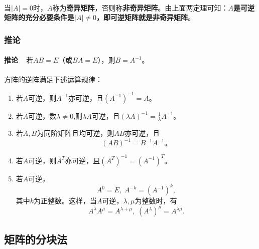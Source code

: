 \paragraph{}
当$|A|=0$时，$A$称为\textbf{奇异矩阵}，否则称\textbf{非奇异矩阵}。由上面两定理可知：\textbf{$A$是可逆矩阵的充分必要条件是$|A|\neq 0$，即可逆矩阵就是非奇异矩阵}。

\subsubsection{推论}
\paragraph{}
\textbf{推论~~}若$AB=E$（或$BA=E$），则$B=A^{-1}$。

\paragraph{}
方阵的逆阵满足下述运算规律：
\begin{enumerate}
  \item 若$A$可逆，则$A^{-1}$亦可逆，且$(A^{-1})^{-1} = A$。
  \item 若$A$可逆，数$\lambda\neq 0$,则$\lambda A$可逆，且$(\lambda A)^{-1} = \frac{1}{\lambda}A^{-1}$。
  \item 若$A,B$为同阶矩阵且均可逆，则$AB$亦可逆，且
  \begin{equation*}
    (AB)^{-1} = B^{-1}A^{-1}。
  \end{equation*}
  \item 若$A$可逆，则$A^T$亦可逆，且$(A^T)^{-1}=(A^{-1})^T$。
  \item 若$A$可逆，
  \begin{equation*}
    A^0 = E, \; A^{-k} = (A^{-1})^k,
  \end{equation*}
  其中$k$为正整数。这样，当$A$可逆，$\lambda, \mu$为整数时，有
  \begin{equation*}
    A^\lambda A^\mu = A^{\lambda + \mu}, \; (A^\lambda)^\mu = A^{\lambda\mu}.
  \end{equation*}
\end{enumerate}

\subsection{矩阵的分块法}
\paragraph{}
